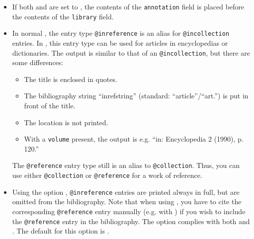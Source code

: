 \documentclass[english]{scrartcl}
\begin{document}
\begin{itemize}
	      , the field \texttt{library} will be printed in 
	      {\small\sffamily small sans serif} typeface at the end of the entry. 
	      The default value for this option is .
	      You can alter the appearance by redefining the following command:
				\begin{lstlisting}
\renewcommand{\libraryfont}{\small\sffamily}
				\end{lstlisting}
	\item If both  and  are set to 
	      , the contents of the \texttt{annotation} field is placed 
	      before the contents of the \texttt{library} field.
	\item In
        normal \bl{}, the entry type \texttt{@inreference} is an alias for 
	      \texttt{@incollection} entries. In \bldw{}, this entry type can be used 
	      for articles in encyclopedias or dictionaries. The output is similar to 
	      that of an \texttt{@incollection}, but there are some differences:
	      \begin{itemize}
          \item The title is enclosed in quotes.
          \item The bibliography string \enquote{inrefstring} (standard:
                \enquote{article}\slash\enquote{art.}) is put in front
                of the title.
          \item The location is not printed.
          \item With a \texttt{volume} present, the output is e.g. \enquote{in:
                Encyclopedia 2 (1990), p. 120.}
        \end{itemize}
        The \texttt{@reference} entry type still is an alias to \texttt{@collection}.
        Thus, you can use either \texttt{@collection} or \texttt{@reference} for
        a work of reference.
  \item Using the option ,
  			\texttt{@inreference} entries are printed always in full, but are omitted 
				from the bibliography. Note that when using , you have to 
				cite the corresponding \texttt{@reference} entry manually (e.g. with ) 
				if you wish to include the \texttt{@reference} entry in the bibliography. The 
				 option complies with both  and
			  . The default for this option is .


\end{itemize}
\end{document}
